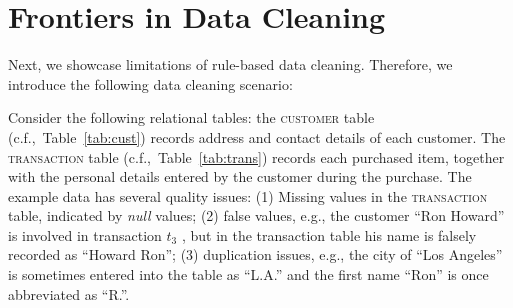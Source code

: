 \section{Frontiers in Data Cleaning}

Next, we showcase limitations of rule-based data cleaning. Therefore, we introduce the following data cleaning scenario:
\label{sec:example}
\begin{table}[h]\footnotesize
\scriptsize
{}
\vspace{-1em}
\caption{\textsc{customer} table (with errors)}
\label{tab:cust}
\end{table}

\begin{table}[h]\footnotesize
\scriptsize
{}
\vspace{-1em}
\caption{\textsc{transaction} table (with errors)}
\label{tab:trans}
\end{table}


Consider the following relational tables: the \textsc{customer} table (c.f.,~Table~\ref{tab:cust}) 
records address and contact details of each customer. The \textsc{transaction} table (c.f.,~Table~\ref{tab:trans}) 
records each purchased item, together with the personal details entered by the customer during the purchase. 
The example data has several quality issues: (1) Missing values in the \textsc{transaction} table, indicated by \emph{null} values; (2) false values, e.g.,  the customer ``Ron Howard'' is involved in transaction $t_3$ , but in the transaction table his name is falsely recorded as ``Howard Ron''; (3) duplication issues, e.g., the city of ``Los Angeles'' is sometimes entered into the table as ``L.A.'' and the first name ``Ron'' is once abbreviated as ``R.''. 

